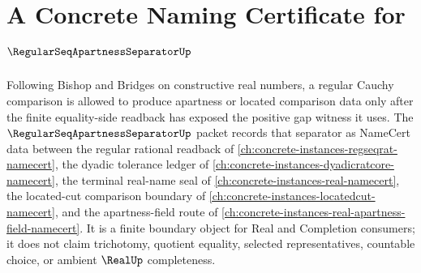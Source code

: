 \chapter{A Concrete Naming Certificate for $\RegularSeqApartnessSeparatorUp$}
\label{ch:concrete-instances-regular-seq-apartness-separator-namecert}

Following Bishop and Bridges on constructive real numbers, a regular Cauchy comparison is allowed to produce apartness or located comparison data only after the finite equality-side readback has exposed the positive gap witness it uses. The $\RegularSeqApartnessSeparatorUp$ packet records that separator as NameCert data between the regular rational readback of \autoref{ch:concrete-instances-regseqrat-namecert}, the dyadic tolerance ledger of \autoref{ch:concrete-instances-dyadicratcore-namecert}, the terminal real-name seal of \autoref{ch:concrete-instances-real-namecert}, the located-cut comparison boundary of \autoref{ch:concrete-instances-locatedcut-namecert}, and the apartness-field route of \autoref{ch:concrete-instances-real-apartness-field-namecert}. It is a finite boundary object for Real and Completion consumers; it does not claim trichotomy, quotient equality, selected representatives, countable choice, or ambient $\RealUp$ completeness.

